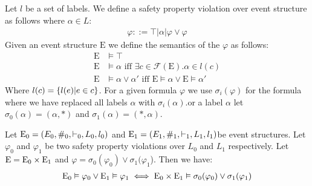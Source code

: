 Let $l$ be a set of labels.
We define a safety property violation over event structure as follows
where $\alpha \in L$:
\begin{align*}
    \varphi ::=  \top | \alpha | \varphi \vee \varphi
\end{align*}
Given an event structure $\mathrm{E}$ we define the semantics of
the $\varphi$ as follows:
\begin{align*}
    \mathrm{E} & \vDash \top                               \\
    \mathrm{E} & \vDash \alpha \text{ iff }
    \exists c \in \mathcal{F}(\mathrm{E}). \alpha \in l(c) \\
    \mathrm{E} & \vDash \alpha \vee \alpha' \text{ iff }
    \mathrm{E} \vDash \alpha \vee \mathrm{E} \vDash \alpha'
\end{align*}
Where $l(c) = \{l(e)| e \in c\}$.
For a given formula $\varphi$ we use $\sigma_i(\varphi)$ for the formula
where we have replaced all labels $\alpha$ with $\sigma_i(\alpha)$.or a label $\alpha$ let $\sigma_0(\alpha) = (\alpha,*)$ and
$\sigma_1(\alpha) = (*,\alpha)$.
\begin{theorem}
    Let $\mathrm{E}_0 = (E_0,\#_0,\vdash_0,L_0,l_0)$
    and $\mathrm{E}_1 = (E_1,\#_1,\vdash_1,L_1,l_1)$be event structures.
    Let $\varphi_0$ and $\varphi_1$ be two safety property violations
    over $L_0$ and $L_1$ respectively.
    Let $\mathrm{E} = \mathrm{E}_0 \times \mathrm{E}_1$ and
    $\varphi =  \sigma_0(\varphi_0) \vee \sigma_1(\varphi_1$).
    Then we have:
    \begin{align*}
        \mathrm{E}_0 \vDash \varphi_0 \vee \mathrm{E}_1 \vDash \varphi_1 
        \iff 
        \mathrm{E}_0 \times \mathrm{E}_1 \vDash \sigma_0(\varphi_0) 
        \vee \sigma_1(\varphi_1)
    \end{align*}
\end{theorem}
